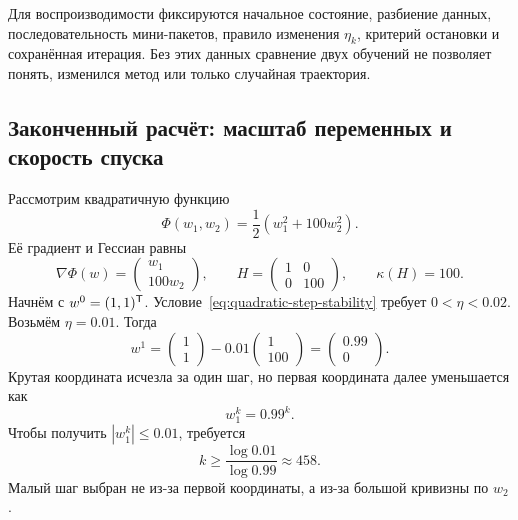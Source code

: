 Для воспроизводимости фиксируются начальное состояние, разбиение данных, последовательность мини-пакетов, правило изменения $\eta_k$, критерий остановки и сохранённая итерация. Без этих данных сравнение двух обучений не позволяет понять, изменился метод или только случайная траектория.

\subsection{Законченный расчёт: масштаб переменных и скорость спуска}
\label{subsec:worked-conditioning-gradient-descent}
Рассмотрим квадратичную функцию
\begin{equation}
 \Phi(w_1,w_2)
 =
 \frac12\left(w_1^2+100w_2^2\right).
\end{equation}
Её градиент и Гессиан равны
\begin{equation}
 \nabla\Phi(w)
 =
 \begin{pmatrix}
 w_1\\100w_2
 \end{pmatrix},
 \qquad
 H
 =
 \begin{pmatrix}
 1&0\\0&100
 \end{pmatrix},
 \qquad
 \kappa(H)=100.
\end{equation}
Начнём с $w^0=(1,1)^{\mathsf{T}}$. Условие~\eqref{eq:quadratic-step-stability} требует $0<\eta<0.02$. Возьмём $\eta=0.01$. Тогда
\begin{equation}
 w^1
 =
 \begin{pmatrix}
 1\\1
 \end{pmatrix}
 -0.01
 \begin{pmatrix}
 1\\100
 \end{pmatrix}
 =
 \begin{pmatrix}
 0.99\\0
 \end{pmatrix}.
\end{equation}
Крутая координата исчезла за один шаг, но первая координата далее уменьшается как
\begin{equation}
 w_1^k
 =
 0.99^k.
\end{equation}
Чтобы получить $|w_1^k|\leq0.01$, требуется
\begin{equation}
 k
 \geq
 \frac{\log 0.01}{\log 0.99}
 \approx
 458.
\end{equation}
Малый шаг выбран не из-за первой координаты, а из-за большой кривизны по $w_2$.

